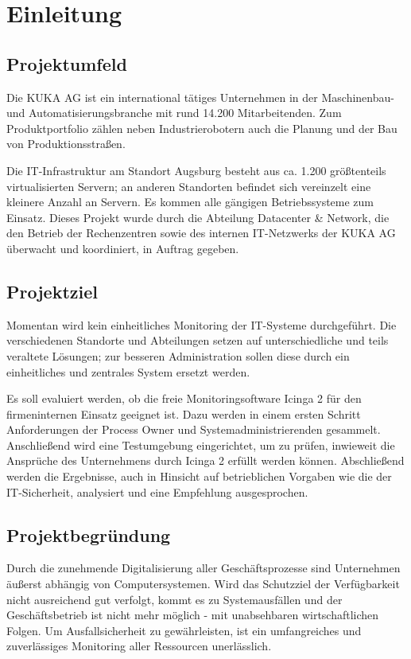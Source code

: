 \section{Einleitung}
\label{sec:Einleitung}

\subsection{Projektumfeld} 
\label{sec:Projektumfeld}
Die KUKA AG ist ein international tätiges Unternehmen in der Maschinenbau- und Automatisierungsbranche mit rund 14.200 Mitarbeitenden. Zum Produktportfolio zählen neben Industrierobotern auch die Planung und der Bau von Produktionsstraßen.

Die IT-Infrastruktur am Standort Augsburg besteht aus ca. 1.200 größtenteils virtualisierten Servern; an anderen Standorten befindet sich vereinzelt eine kleinere Anzahl an Servern. Es kommen alle gängigen Betriebssysteme zum Einsatz. Dieses Projekt wurde durch die Abteilung \glqq Datacenter \& Network\grqq{}, die den Betrieb der Rechenzentren sowie des internen IT-Netzwerks der KUKA AG überwacht und koordiniert, in Auftrag gegeben.

\subsection{Projektziel} 
\label{sec:Projektziel}
Momentan wird kein einheitliches Monitoring der IT-Systeme durchgeführt. Die verschiedenen Standorte und Abteilungen setzen auf unterschiedliche und teils veraltete Lösungen; zur besseren Administration sollen diese durch ein einheitliches und zentrales System ersetzt werden.

Es soll evaluiert werden, ob die freie Monitoringsoftware \glqq Icinga 2\grqq{} für den firmeninternen Einsatz geeignet ist. Dazu werden in einem ersten Schritt Anforderungen der Process Owner und Systemadministrierenden gesammelt. Anschließend wird eine Testumgebung eingerichtet, um zu prüfen, inwieweit die Ansprüche des Unternehmens durch \glqq Icinga 2\grqq{} erfüllt werden können. Abschließend werden die Ergebnisse, auch in Hinsicht auf betrieblichen Vorgaben wie die der IT-Sicherheit, analysiert und eine Empfehlung ausgesprochen.

\subsection{Projektbegründung} 
\label{sec:Projektbegruendung}
Durch die zunehmende Digitalisierung aller Geschäftsprozesse sind Unternehmen äußerst abhängig von Computersystemen. Wird das Schutzziel der Verfügbarkeit nicht ausreichend gut verfolgt, kommt es zu Systemausfällen und der Geschäftsbetrieb ist nicht mehr möglich - mit unabsehbaren wirtschaftlichen Folgen. Um Ausfallsicherheit zu gewährleisten, ist ein umfangreiches und zuverlässiges Monitoring aller Ressourcen unerlässlich.

